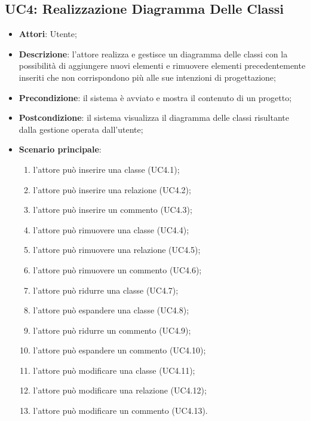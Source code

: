 \subsection{UC4: Realizzazione Diagramma Delle Classi}
\label{UC4}
\begin{itemize}
\item \textbf{Attori}: Utente;
\item \textbf{Descrizione}: l'attore realizza e gestisce un diagramma delle classi con la possibilità di aggiungere nuovi elementi e rimuovere elementi precedentemente inseriti che non corrispondono più alle sue intenzioni di progettazione;
\item \textbf{Precondizione}: il sistema è avviato e mostra il contenuto di un progetto;
\item \textbf{Postcondizione}: il sistema visualizza il diagramma delle classi risultante dalla gestione operata dall'utente;
\item \textbf{Scenario principale}:
	\begin{enumerate}
	 \item l'attore può inserire una classe (UC4.1);
	 \item l'attore può inserire una relazione (UC4.2);
	 \item l'attore può inserire un commento (UC4.3);
	 \item l'attore può rimuovere una classe (UC4.4);
	 \item l'attore può rimuovere una relazione (UC4.5);
	 \item l'attore può rimuovere un commento (UC4.6);
	 \item l'attore può ridurre una classe (UC4.7);
	 \item l'attore può espandere una classe (UC4.8);
	 \item l'attore può ridurre un commento (UC4.9);
	 \item l'attore può espandere un commento (UC4.10);
	  \item l'attore può modificare una classe (UC4.11);
	 \item l'attore può modificare una relazione (UC4.12);
	 \item l'attore può modificare un commento (UC4.13).
	\end{enumerate}
\end{itemize}

